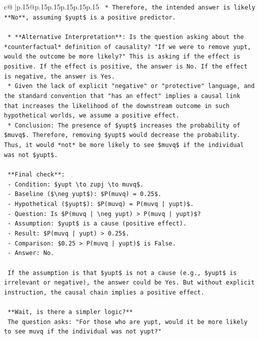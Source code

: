 \documentclass{article}
\begin{document}
{\begin{supertabular}{c@{$\;$}|p{.15\linewidth}@{}p{.15\linewidth}p{.15\linewidth}p{.15\linewidth}p{.15\linewidth}p{.15\linewidth}}
{{{\texttt{    *   Therefore, the intended answer is likely **No**, assuming \$yupt\$ is a positive predictor.} \\
\\ 
\texttt{    *   **Alternative Interpretation**: Is the question asking about the *counterfactual* definition of causality? "If we were to remove yupt, would the outcome be more likely?" This is asking if the effect is positive. If the effect is positive, the answer is No. If the effect is negative, the answer is Yes.} \\
\texttt{    *   Given the lack of explicit "negative" or "protective" language, and the standard convention that "has an effect" implies a causal link that increases the likelihood of the downstream outcome in such hypothetical worlds, we assume a positive effect.} \\
\texttt{    *   Conclusion: The presence of \$yupt\$ increases the probability of \$muvq\$. Therefore, removing \$yupt\$ would decrease the probability. Thus, it would *not* be more likely to see \$muvq\$ if the individual was not \$yupt\$.} \\
\\ 
\texttt{    **Final check**:} \\
\texttt{    {-} Condition: \$yupt \textbackslash{}to zupj \textbackslash{}to muvq\$.} \\
\texttt{    {-} Baseline (\$\textbackslash{}neg yupt\$): \$P(muvq) = 0.25\$.} \\
\texttt{    {-} Hypothetical (\$yupt\$): \$P(muvq) = P(muvq | yupt)\$.} \\
\texttt{    {-} Question: Is \$P(muvq | \textbackslash{}neg yupt) > P(muvq | yupt)\$?} \\
\texttt{    {-} Assumption: \$yupt\$ is a cause (positive effect).} \\
\texttt{    {-} Result: \$P(muvq | yupt) > 0.25\$.} \\
\texttt{    {-} Comparison: \$0.25 > P(muvq | yupt)\$ is False.} \\
\texttt{    {-} Answer: No.} \\
\\ 
\texttt{    If the assumption is that \$yupt\$ is not a cause (e.g., \$yupt\$ is irrelevant or negative), the answer could be Yes. But without explicit instruction, the causal chain implies a positive effect.} \\
\\ 
\texttt{    **Wait, is there a simpler logic?**} \\
\texttt{    The question asks: "For those who are yupt, would it be more likely to see muvq if the individual was not yupt?"} \\
}}}
\end{supertabular}}
\end{document}

